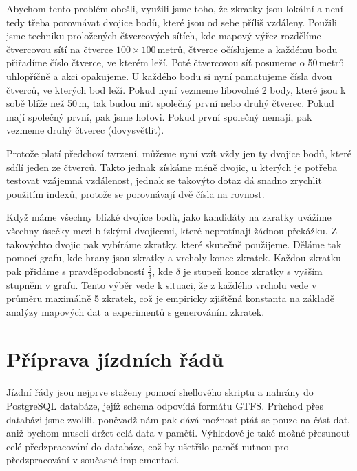 Abychom tento problém obešli, využili jsme toho, že zkratky jsou lokální a není
tedy třeba porovnávat dvojice bodů, které jsou od sebe příliš vzdáleny. Použili
jsme techniku proložených čtvercových sítích, kde mapový výřez rozdělíme
čtvercovou sítí na čtverce $100\times100$\,metrů, čtverce očíslujeme a každému
bodu přiřadíme číslo čtverce, ve kterém leží. Poté čtvercovou síť posuneme o
50\,metrů uhlopříčně a akci opakujeme. U každého bodu si nyní pamatujeme čísla
dvou čtverců, ve kterých bod leží. Pokud nyní vezmeme libovolné 2 body, které
jsou k sobě blíže než 50\,m, tak budou mít společný první nebo druhý čtverec.
Pokud mají společný první, pak jsme hotovi. Pokud první společný nemají, pak
vezmeme druhý čtverec (\TODO dovysvětlit).

Protože platí předchozí tvrzení, můžeme nyní vzít vždy jen ty dvojice bodů,
které sdílí jeden ze čtverců. Takto jednak získáme méně dvojic, u kterých je
potřeba testovat vzájemná vzdálenost, jednak se takovýto dotaz dá snadno
zrychlit použitím indexů, protože se porovnávají dvě čísla na rovnost. 

Když máme všechny blízké dvojice bodů, jako kandidáty na zkratky uvážíme
všechny úsečky mezi blízkými dvojicemi, které neprotínají žádnou překážku. Z
takovýchto dvojic pak vybíráme zkratky, které skutečně použijeme. Děláme
tak pomocí grafu, kde hrany jsou zkratky a vrcholy konce zkratek. Každou zkratku
pak přidáme s pravděpodobností $\frac{5}{\delta}$, kde $\delta$ je stupeň konce
zkratky s vyšším stupněm v grafu. Tento výběr vede k situaci, že z každého
vrcholu vede v průměru maximálně 5 zkratek, což je empiricky zjištěná konstanta
na základě analýzy mapových dat a experimentů s generováním zkratek.

\section{Příprava jízdních řádů}
\label{ch:implementace:GTFS}
Jízdní řády jsou nejprve staženy pomocí shellového skriptu a nahrány do
PostgreSQL databáze, jejíž schema odpovídá formátu GTFS. Průchod přes databázi
jsme zvolili, poněvadž nám pak dává možnost ptát se pouze na část dat,
aniž bychom museli držet celá data v paměti. Výhledově je také možné přesunout
celé předzpracování do databáze, což by ušetřilo paměť nutnou pro předzpracování
v současné implementaci.

